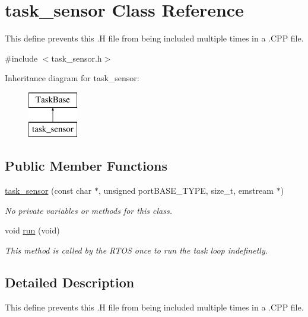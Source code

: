 \hypertarget{classtask__sensor}{\section{task\-\_\-sensor Class Reference}
\label{classtask__sensor}
}


This define prevents this .H file from being included multiple times in a .C\-P\-P file.  




{\ttfamily \#include $<$task\-\_\-sensor.\-h$>$}

Inheritance diagram for task\-\_\-sensor\-:\begin{figure}[H]
\begin{center}
\leavevmode
\includegraphics[height=2.000000cm]{classtask__sensor}
\end{center}
\end{figure}
\subsection*{Public Member Functions}
\begin{DoxyCompactItemize}
\item 
\hyperlink{classtask__sensor_adbeab920f84be1ad5ab1909c47bce1bb}{task\-\_\-sensor} (const char $\ast$, unsigned port\-B\-A\-S\-E\-\_\-\-T\-Y\-P\-E, size\-\_\-t, emstream $\ast$)
\begin{DoxyCompactList}\small\item\em No private variables or methods for this class. \end{DoxyCompactList}\item 
void \hyperlink{classtask__sensor_ab9b6d10d8ea2f6df8f497e4b6c1173a2}{run} (void)
\begin{DoxyCompactList}\small\item\em This method is called by the R\-T\-O\-S once to run the task loop indefinetly. \end{DoxyCompactList}\end{DoxyCompactItemize}


\subsection{Detailed Description}
This define prevents this .H file from being included multiple times in a .C\-P\-P file. 

